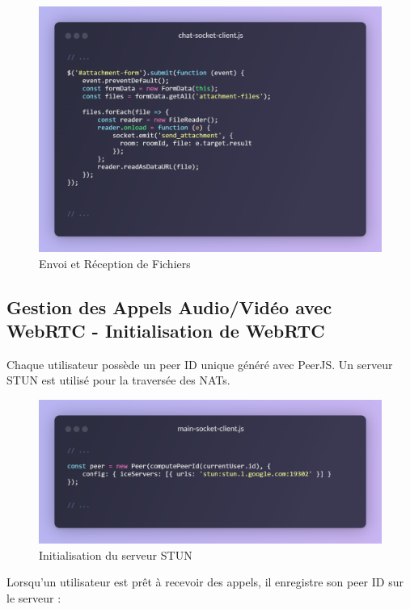 \begin{figure}[H]
    \centering
    \includegraphics[width=15cm]{assets/annexes/snippet (20).png}
    \caption{ Envoi et Réception de Fichiers}
\end{figure}

\subsection*{Gestion des Appels Audio/Vidéo avec WebRTC - Initialisation de WebRTC}

Chaque utilisateur possède un peer ID unique généré avec PeerJS. Un serveur STUN est utilisé pour la traversée des NATs.

\begin{figure}[H]
    \centering
    \includegraphics[width=15cm]{assets/annexes/snippet (21).png}
    \caption{ Initialisation du serveur STUN}
\end{figure}

Lorsqu'un utilisateur est prêt à recevoir des appels, il enregistre son peer ID sur le serveur :

